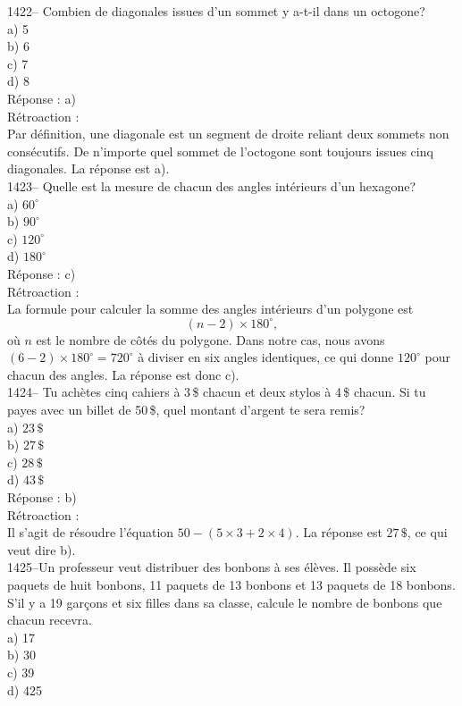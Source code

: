 1422-- Combien de diagonales issues d'un sommet y a-t-il dans un octogone?\\
a) 5\\
b) 6\\
c) 7\\
d) 8\\

R\'eponse : a)\\

R\'etroaction :\\
Par d\'efinition, une diagonale est un segment de droite reliant
deux sommets non cons\'ecutifs. De n'importe quel sommet de
l'octogone sont toujours
issues cinq diagonales. La r\'eponse est a).\\

1423-- Quelle est la mesure de chacun des angles int\'erieurs d'un hexagone?\\
a) $60^\circ$\\
b) $90^\circ$\\
c) $120^\circ$\\
d) $180^\circ$\\

R\'eponse : c)\\

R\'etroaction :\\
La formule pour calculer la somme des angles int\'erieurs d'un
polygone est
$$(n-2)\times180^\circ,$$ o\`u $n$ est le nombre de c\^ot\'es du polygone.
Dans notre cas, nous avons $(6-2)\times180^\circ=720^\circ$ \`a
diviser en six angles identiques, ce qui donne $120^\circ$ pour chacun des
angles. La r\'eponse est donc c).\\

1424-- Tu ach\`etes cinq cahiers \`a 3\,\$ chacun et deux stylos \`a
4\,\$ chacun.
Si tu payes avec un billet de 50\,\$, quel montant d'argent te sera remis?\\
a) $23\,\$$\\
b) $27\,\$$\\
c) $28\,\$$\\
d) $43\,\$$\\

R\'eponse : b)\\

R\'etroaction :\\
Il s'agit de r\'esoudre l'\'equation $50-(5\times3+2\times4)$. La r\'eponse
est $27\,\$$, ce qui veut dire b).\\

1425--Un professeur veut distribuer des bonbons \`a ses \'el\`eves. Il
poss\`ede six paquets de huit bonbons, 11 paquets de 13 bonbons et
13 paquets de 18 bonbons. S'il y a 19 gar\c cons et six filles dans
sa classe, calcule le
nombre de bonbons que chacun recevra.\\
a) 17\\
b) 30\\
c) 39\\
d) 425\\

